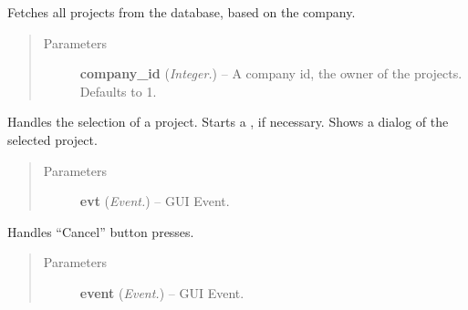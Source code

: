 \documentclass[letterpaper,10pt,english]{sphinxmanual}
\begin{document}
\begin{fulllineitems}
\begin{fulllineitems}
\begin{quote}
\begin{description}
\end{description}\end{quote}

\end{fulllineitems}


\begin{fulllineitems}
\label{api:wos.ProjectSelectDialog.GetProjects}
Fetches all projects from the database, based on the company.
\begin{quote}\begin{description}
\item[{Parameters}] \leavevmode
\textbf{company\_id} (\emph{Integer.}) -- A company id, the owner of the projects. Defaults to 1.

\end{description}\end{quote}

\end{fulllineitems}


\begin{fulllineitems}
\label{api:wos.ProjectSelectDialog.SelEvent}
Handles the selection of a project. Starts a {\hyperref[api:wos.CURRENT_PROJECT]{}}, if necessary. Shows a dialog of the selected project.
\begin{quote}\begin{description}
\item[{Parameters}] \leavevmode
\textbf{evt} (\emph{Event.}) -- GUI Event.

\end{description}\end{quote}

\end{fulllineitems}


\begin{fulllineitems}
\label{api:wos.ProjectSelectDialog.onCancel}
Handles ``Cancel'' button presses.
\begin{quote}\begin{description}
\item[{Parameters}] \leavevmode
\textbf{event} (\emph{Event.}) -- GUI Event.

\end{description}\end{quote}

\end{fulllineitems}


\end{fulllineitems}
\end{document}

